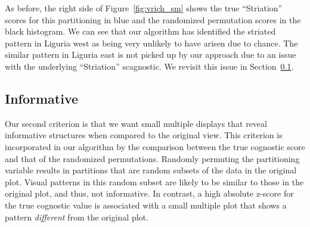 As before, the right side of Figure~\ref{fig:vrich_sm} shows the true ``Striation'' scores for this partitioning in blue and the randomized permutation scores in the black histogram. We can see that our algorithm has identified the striated pattern in Liguria west as being very unlikely to have arisen due to chance. The similar pattern in Liguria east is not picked up by our approach due to an issue with the underlying ``Striation'' scagnostic. We revisit this issue in Section~\ref{}.

\subsection{Informative}
Our second criterion is that we want small multiple displays that reveal informative structures when compared to the original view. This criterion is incorporated in our algorithm by the comparison between the true cognostic score and that of the randomized permutations. Randomly permuting the partitioning variable results in partitions that are random subsets of the data in the original plot. Visual patterns in this random subset are likely to be similar to those in the original plot, and thus, not informative. In contrast, a high absolute z-score for the true cognostic value is associated with a small multiple plot that shows a pattern \emph{different} from the original plot.

